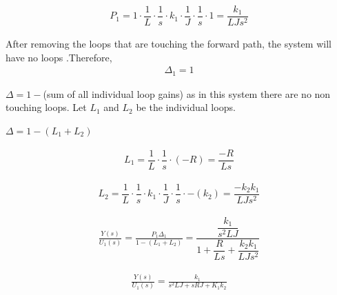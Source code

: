\begin{enumerate}[label=\thesection.\arabic*.,ref=\thesection.\theenumi]
\begin{align}
P_1=1\cdot\dfrac{1}{L}\cdot\dfrac{1}{s}\cdot k_1 \cdot\dfrac{1}{J}\cdot\dfrac{1}{s}\cdot1=\dfrac{k_1}{LJs^2}
\end{align}

After removing the loops that are touching the forward path, the system will have no loops .Therefore,
\begin{align}
\Delta_1 =1    
\end{align} 



$\Delta= 1 - $(sum of all individual loop gains)
as in this system there are no non touching loops.
Let $L_1$ and $L_2$ be the individual loops.

\centering
$\Delta= 1 - (L_1+L_2)$

\begin{align}
L_1= \dfrac{1}{L}\cdot \dfrac {1}{s}\cdot(-R)=\dfrac{-R}{Ls}
\end{align}


\begin{align}
L_2=\dfrac{1}{L}\cdot \dfrac{1}{s}\cdot k_1 \cdot \dfrac{1}{J} \cdot \dfrac{1}{s}\cdot -(k_2) =\dfrac{-k_2 k_1}{LJs^2}
\end{align}


\begin{align}
\frac{Y(s)}{U_1(s)} = \frac{P_1 \Delta_1}{1-(L_1+L_2)}=\dfrac{\dfrac{k_1}{s^2LJ}}{1+\dfrac{R}{Ls}+\dfrac{k_2 k_1}{LJs^2}}
\end{align}

\centering
\begin{align}
\frac{Y(s)}{U_1(s)}=\frac{k_1}{s^2LJ+sRJ+K_1k_2}
\end{align}


\end{enumerate}
